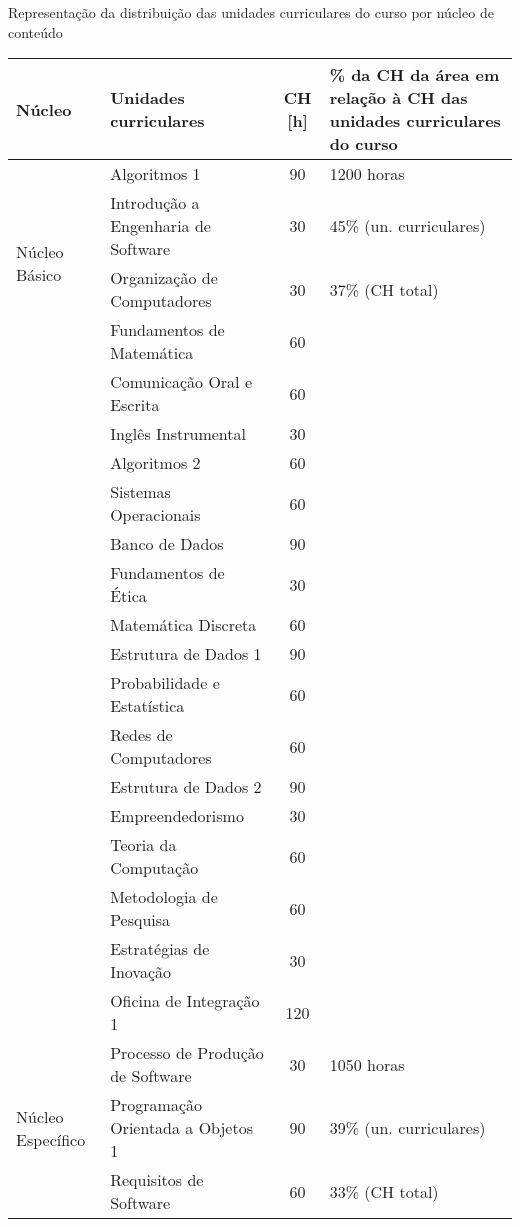 
\begin{quadro}[ht!]
\caption{Representação da distribuição das unidades curriculares do curso por núcleo de conteúdo}
\label{tab:discarea}
\centering
\scriptsize
\begin{tabular}{|l|l|c|p{3.2cm}|}
\hline
\rowcolor{blue1}
Núcleo  & Unidades curriculares & CH [h]  & \% da CH da área em relação à CH das unidades curriculares do curso\\\hline
\multirow{4}{*}{Núcleo Básico} & Algoritmos 1 & 90 & 1200 horas  \\
\cline{2-3} & Introdução a Engenharia de Software & 30 & 45\% (un. curriculares)\\
\cline{2-3} & Organização de Computadores & 30 & 37\% (CH total)\\
\cline{2-3} & Fundamentos de Matemática & 60 & \\
\cline{2-3} & Comunicação Oral e Escrita & 60 & \\
\cline{2-3} & Inglês Instrumental & 30 & \\
\cline{2-3} & Algoritmos 2 & 60 & \\
\cline{2-3} & Sistemas Operacionais & 60 & \\
\cline{2-3} & Banco de Dados & 90 & \\
\cline{2-3} & Fundamentos de Ética & 30 & \\
\cline{2-3} & Matemática Discreta & 60 & \\
\cline{2-3} & Estrutura de Dados 1 & 90 & \\
\cline{2-3} & Probabilidade e Estatística & 60 & \\
\cline{2-3} & Redes de Computadores & 60 & \\
\cline{2-3} & Estrutura de Dados 2 & 90 & \\
\cline{2-3} & Empreendedorismo & 30 & \\
\cline{2-3} & Teoria da Computação & 60 & \\
\cline{2-3} & Metodologia de Pesquisa & 60 & \\
\cline{2-3} & Estratégias de Inovação & 30 & \\
\cline{2-3} & Oficina de Integração 1 & 120 & \\
\hline
\multirow{4}{*}{Núcleo Específico} & Processo de Produção de Software & 30 & 1050 horas  \\
\cline{2-3} & Programação Orientada a Objetos 1  & 90 & 39\% (un. curriculares)\\
\cline{2-3} & Requisitos de Software & 60 & 33\% (CH total)\\

\end{tabular}
\end{quadro}
